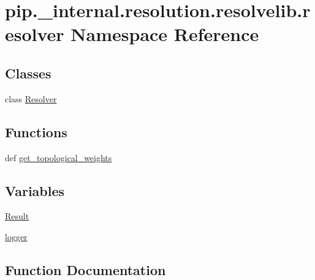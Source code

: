 \hypertarget{namespacepip_1_1__internal_1_1resolution_1_1resolvelib_1_1resolver}{}\section{pip.\+\_\+internal.\+resolution.\+resolvelib.\+resolver Namespace Reference}
\label{namespacepip_1_1__internal_1_1resolution_1_1resolvelib_1_1resolver}
\subsection*{Classes}
\begin{DoxyCompactItemize}
\item 
class \hyperlink{classpip_1_1__internal_1_1resolution_1_1resolvelib_1_1resolver_1_1Resolver}{Resolver}
\end{DoxyCompactItemize}
\subsection*{Functions}
\begin{DoxyCompactItemize}
\item 
def \hyperlink{namespacepip_1_1__internal_1_1resolution_1_1resolvelib_1_1resolver_aac74e4b9f3c7a85d465f1113ca447420}{get\+\_\+topological\+\_\+weights}
\end{DoxyCompactItemize}
\subsection*{Variables}
\begin{DoxyCompactItemize}
\item 
\hyperlink{namespacepip_1_1__internal_1_1resolution_1_1resolvelib_1_1resolver_a42ac482e763a0a9f8aada5cd449f26fb}{Result}
\item 
\hyperlink{namespacepip_1_1__internal_1_1resolution_1_1resolvelib_1_1resolver_a5dcec080265802c61eb4a6e08c345274}{logger}
\end{DoxyCompactItemize}


\subsection{Function Documentation}
\mbox{\label{namespacepip_1_1__internal_1_1resolution_1_1resolvelib_1_1resolver_aac74e4b9f3c7a85d465f1113ca447420}} 
